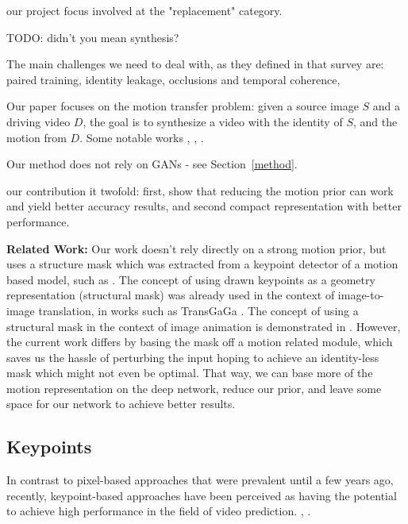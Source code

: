 \documentclass{article}
\begin{document}
our project focus involved at the "replacement" category.

TODO: didn't you mean synthesis?

The main challenges we need to deal with, as they defined in that survey are: paired training, identity leakage, occlusions and temporal coherence,


Our paper focuses on the motion transfer problem: given a source image $S$
and a driving video $D$, the goal is to synthesize a video with the identity
of $S$, and the motion from $D$.
Some notable works \cite{siarohin2020order}, \cite{wiles2018x2face},
\cite{siarohin2019animating}.

Our method does not rely on GANs - see Section~\ref{method}.

our contribution it twofold: first, show that reducing the motion prior can
work and yield better accuracy results, and second compact representation with better performance.

\medskip

\textbf{Related Work:} Our work doesn't rely directly on a strong motion prior,
but uses a structure mask which was extracted from a keypoint detector
of a motion based model, such as \cite{siarohin2020order}. The concept of using drawn keypoints as
a geometry representation (structural mask) was already used in the context
of image-to-image translation, in works such as TransGaGa \cite{wu2019transgaga}.
The concept of using a structural mask in the context of image animation is
demonstrated in \cite{shalev2020image}. However, the current work differs
by basing the mask off a motion related module, which saves us the hassle
of perturbing the input hoping to achieve an identity-less mask which might
not even be optimal. That way, we
can base more of the motion representation on the deep network, reduce our
prior, and leave some space for our network to achieve better results.


\subsection{Keypoints}
In contrast to pixel-based approaches that were prevalent until a few years
ago, recently, keypoint-based approaches have been perceived as having the
potential to achieve high performance in the field of video prediction.
\cite{kim2019unsupervised}, \cite{balakrishnan2018synthesizing}
\cite{ma2017pose}  \cite{reed2017parallel} \cite{chan2019everybody}
\cite{villegas2017learning}
\cite{cai2018deep}
\cite{wang2018every}
\cite{reed2015deep}.
\end{document}
